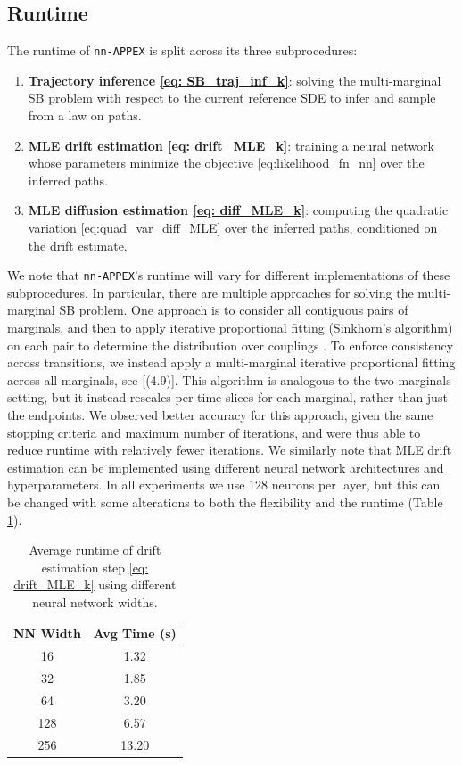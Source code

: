 \documentclass[twoside]{article}
\newcommand{\nappex}{\texttt{nn-APPEX}}
\begin{document}
\subsection{Runtime}
The runtime of \nappex{} is split across its three subprocedures: 
\begin{enumerate}
    \item \textbf{Trajectory inference \eqref{eq: SB_traj_inf_k}}: solving the multi-marginal SB problem with respect to the current reference SDE to infer and sample from a law on paths.
    \item \textbf{MLE drift estimation \eqref{eq: drift_MLE_k}}: training a neural network whose parameters minimize the objective \eqref{eq:likelihood_fn_nn} over the inferred paths.
    \item \textbf{MLE diffusion estimation \eqref{eq: diff_MLE_k}}: computing the quadratic variation \eqref{eq:quad_var_diff_MLE} over the inferred paths, conditioned on the drift estimate.
\end{enumerate}
We note that \nappex's runtime will vary for different implementations of these subprocedures. In particular, there are multiple approaches for solving the multi-marginal SB problem. One approach is to consider all contiguous pairs of marginals, and then to apply iterative proportional fitting (Sinkhorn's algorithm) on each pair to determine the distribution over couplings \citep{shen2025multi, guan2024identifying}. To enforce consistency across transitions, we instead apply a multi-marginal iterative proportional fitting across all marginals, see \citep{marino2020optimal}[(4.9)]. This algorithm is analogous to the two-marginals setting, but it instead rescales per-time slices for each marginal, rather than just the endpoints. We observed better accuracy for this approach, given the same stopping criteria and maximum number of iterations, and were thus able to reduce runtime with relatively fewer iterations. We similarly note that  MLE drift estimation can be implemented using different neural network architectures and hyperparameters. In all experiments we use $128$ neurons per layer, but this can be changed with some alterations to both the flexibility and the runtime (Table \ref{tab:appex_timing_nnsize}).



\begin{table}[h]
    \centering
    \caption{Average runtime of drift estimation step \eqref{eq: drift_MLE_k} using different neural network widths.}
    \label{tab:appex_timing_nnsize}
    \begin{tabular}{cc}
        \toprule
        \textbf{NN Width} & \textbf{Avg Time (s)} \\
        \midrule
        16  & 1.32  \\
        \midrule
        32  & 1.85  \\
        \midrule
        64  & 3.20  \\
        \midrule
        128 & 6.57  \\
        \midrule
        256 & 13.20 \\
        \bottomrule
    \end{tabular}
\end{table}
\end{document}
